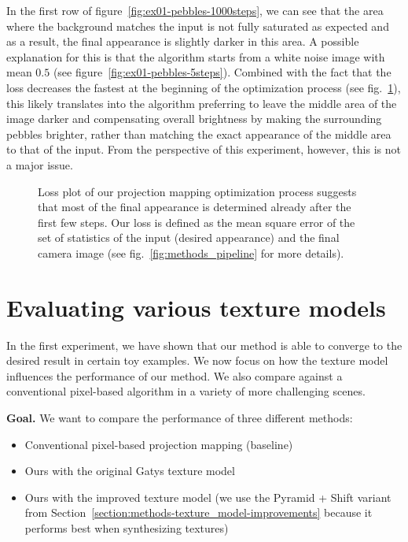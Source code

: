 In the first row of figure~\ref{fig:ex01-pebbles-1000steps}, we can see that the area where the background matches the input is not fully saturated as expected and as a result, the final appearance is slightly darker in this area. A possible explanation for this is that the algorithm starts from a white noise image with mean \(0.5\) (see figure~\ref{fig:ex01-pebbles-5steps}). Combined with the fact that the loss decreases the fastest at the beginning of the optimization process (see fig.~\ref{fig:ex01-loss_plot}), this likely translates into the algorithm preferring to leave the middle area of the image darker and compensating overall brightness by making the surrounding pebbles brighter, rather than matching the exact appearance of the middle area to that of the input. From the perspective of this experiment, however, this is not a major issue.

\begin{figure}[ht]
    \centering
    \def\svgwidth{0.8\textwidth}
    
    \caption{Loss plot of our projection mapping optimization process suggests that most of the final appearance is determined already after the first few steps. Our loss is defined as the mean square error of the set of statistics of the input (desired appearance) and the final camera image (see fig.~\ref{fig:methods_pipeline} for more details).}
    \label{fig:ex01-loss_plot}
\end{figure}

\section{Evaluating various texture models}
\label{section:results-experiments-02}

In the first experiment, we have shown that our method is able to converge to the desired result in certain toy examples. We now focus on how the texture model influences the performance of our method. We also compare against a conventional pixel-based algorithm in a variety of more challenging scenes.

\textbf{Goal.} We want to compare the performance of three different methods:

\begin{itemize}
    \item Conventional pixel-based projection mapping (baseline)
    \item Ours with the original Gatys texture model
    \item Ours with the improved texture model (we use the Pyramid + Shift variant from Section~\ref{section:methods-texture_model-improvements} because it performs best when synthesizing textures)
\end{itemize}


